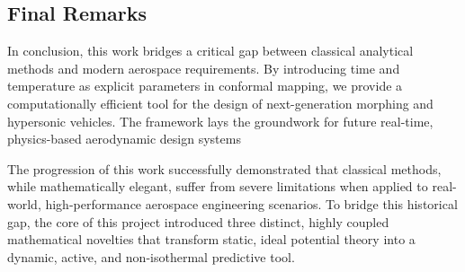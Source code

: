 \documentclass[12pt,a4paper]{article}
\begin{document}
\subsection{Final Remarks}
In conclusion, this work bridges a critical gap between classical analytical methods and modern aerospace requirements. By introducing time and temperature as explicit parameters in conformal mapping, we provide a computationally efficient tool for the design of next-generation morphing and hypersonic vehicles. The framework lays the groundwork for future real-time, physics-based aerodynamic design systems

The progression of this work successfully demonstrated that classical methods, while mathematically elegant, suffer from severe limitations when applied to real-world, high-performance aerospace engineering scenarios. To bridge this historical gap, the core of this project introduced three distinct, highly coupled mathematical novelties that transform static, ideal potential theory into a dynamic, active, and non-isothermal predictive tool.
\end{document}
